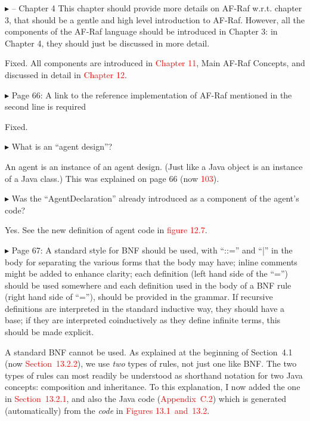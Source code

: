 \documentclass{article}
\newcommand*\R[1]{\textcolor{red}{#1}} %
\newenvironment{them}%
  {\bigskip\noindent\begingroup\color{blue}$\blacktriangleright$\enspace}%
  {\endgroup\par}
\begin{document}
\begin{them}
-- Chapter 4
This chapter should provide more details on AF-Raf w.r.t. chapter 3, that
should be a gentle and high level introduction to AF-Raf. However, all the
components of the AF-Raf language should be introduced in Chapter 3: in Chapter
4, they should just be discussed in more detail.
\end{them}
Fixed. All components are introduced in \R{Chapter 11}, Main AF-Raf Concepts, and discussed in detail in \R{Chapter 12}.

\begin{them}
Page 66:
A link to the reference implementation of AF-Raf mentioned in the second line
is required
\end{them}
Fixed.

\begin{them}
What is an ``agent design''? 
\end{them}

An agent is an instance of an agent design.
(Just like a Java object is an instance of a Java class.)
This was explained on page 66 (now \R{103}).

\begin{them}
Was the ``AgentDeclaration'' already introduced as a component of the agent's
code?
\end{them}
Yes. See the new definition of agent code in \R{figure 12.7}.

\begin{them}
Page 67:
A standard style for BNF should be used, with ``::='' and ``|'' in the body for
separating the various forms that the body may have; inline comments might be
added to enhance clarity; each definition (left hand side of the ``='') should be
used somewhere and each definition used in the body of a BNF rule (right hand
side of ``=''), should be provided in the grammar. If recursive definitions are
interpreted in the standard inductive way, they should have a base; if they are
interpreted coinductively as they define infinite terms, this should be made
explicit. 
\end{them}
A standard BNF cannot be used.
As explained at the beginning of Section~4.1
  (now \R{Section~13.2.2}),
  we use \emph{two} types of rules, not just one like BNF\null.
The two types of rules can most readily be understood as shorthand
  notation for two Java concepts: composition and inheritance.
To this explanation,
  I now added the one in \R{Section~13.2.1},
  and also the Java code (\R{Appendix~C.2})
    which is generated (automatically) from the \emph{code}
      in \R{Figures 13.1~and~13.2}.
\end{document}

